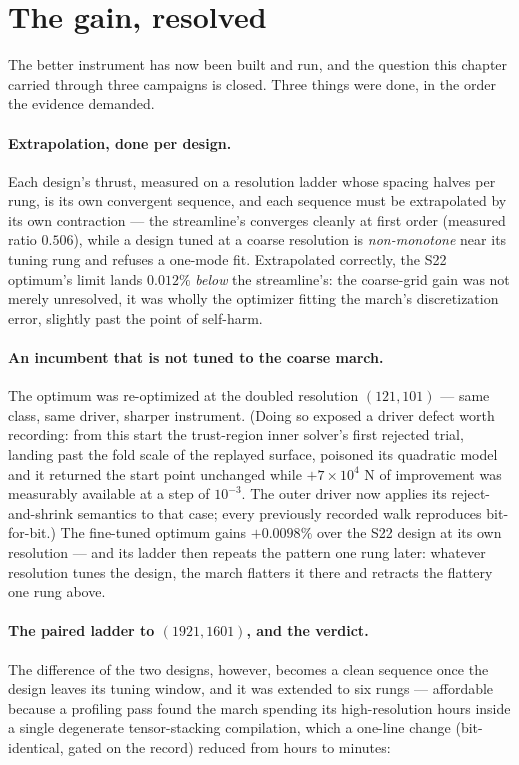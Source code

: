 \section{The gain, resolved}
\label{sec:gainresolved}

The better instrument has now been built and run, and the question
this chapter carried through three campaigns is closed. Three things
were done, in the order the evidence demanded.

\paragraph{Extrapolation, done per design.} Each design's thrust,
measured on a resolution ladder whose spacing halves per rung, is its
own convergent sequence, and each sequence must be extrapolated by
its own contraction --- the streamline's converges cleanly at first
order (measured ratio $0.506$), while a design tuned at a coarse
resolution is \emph{non-monotone} near its tuning rung and refuses a
one-mode fit. Extrapolated correctly, the S22 optimum's limit lands
$0.012\%$ \emph{below} the streamline's: the coarse-grid gain was not
merely unresolved, it was wholly the optimizer fitting the march's
discretization error, slightly past the point of self-harm.

\paragraph{An incumbent that is not tuned to the coarse march.} The
optimum was re-optimized at the doubled resolution $(121,101)$ ---
same class, same driver, sharper instrument. (Doing so exposed a
driver defect worth recording: from this start the trust-region
inner solver's first rejected trial, landing past the fold scale of
the replayed surface, poisoned its quadratic model and it returned
the start point unchanged while $+7\times10^{4}$ N of improvement
was measurably available at a step of $10^{-3}$. The outer driver
now applies its reject-and-shrink semantics to that case; every
previously recorded walk reproduces bit-for-bit.) The fine-tuned
optimum gains $+0.0098\%$ over the S22 design at its own resolution
--- and its ladder then repeats the pattern one rung later: whatever
resolution tunes the design, the march flatters it there and
retracts the flattery one rung above.

\paragraph{The paired ladder to $(1921,1601)$, and the verdict.}
The difference of the two designs, however, becomes a clean sequence
once the design leaves its tuning window, and it was extended to six
rungs --- affordable because a profiling pass found the march
spending its high-resolution hours inside a single degenerate
tensor-stacking compilation, which a one-line change (bit-identical,
gated on the record) reduced from hours to minutes:

